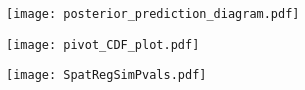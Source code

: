 \documentclass[12pt,english]{article}
\begin{document}
\begin{spacing}{1.9}
    \begin{figure*}
      \begin{center}
        \texttt{[image: posterior\_prediction\_diagram.pdf]}
        \caption{} \label{fig:post_pred}
      \end{center}
    \end{figure*}

    \begin{figure*}
      \begin{center}
        \texttt{[image: pivot\_CDF\_plot.pdf]}
        \caption{} \label{fig:pivotCDF}
      \end{center}
    \end{figure*}

    \begin{figure*}
      \begin{center}
        \texttt{[image: SpatRegSimPvals.pdf]}
        \caption{} \label{fig:SpatReg_pvals}
      \end{center}
    \end{figure*}

  \end{spacing}
\end{document}
